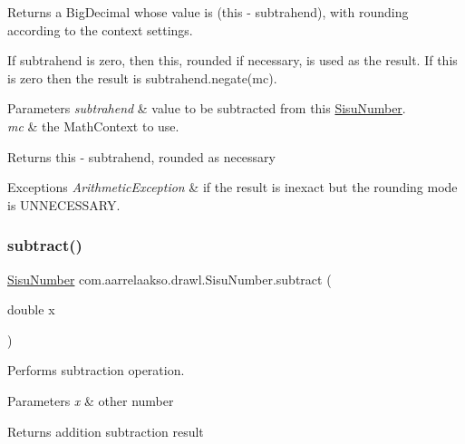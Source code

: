 Returns a Big\+Decimal whose value is (this -\/ subtrahend), with rounding according to the context settings. 

If subtrahend is zero, then this, rounded if necessary, is used as the result. If this is zero then the result is subtrahend.\+negate(mc).


\begin{DoxyParams}{Parameters}
{\em subtrahend} & value to be subtracted from this \hyperlink{classcom_1_1aarrelaakso_1_1drawl_1_1_sisu_number}{Sisu\+Number}. \\
\hline
{\em mc} & the Math\+Context to use. \\
\hline
\end{DoxyParams}
\begin{DoxyReturn}{Returns}
this -\/ subtrahend, rounded as necessary 
\end{DoxyReturn}

\begin{DoxyExceptions}{Exceptions}
{\em Arithmetic\+Exception} & if the result is inexact but the rounding mode is U\+N\+N\+E\+C\+E\+S\+S\+A\+RY. \\
\hline
\end{DoxyExceptions}
\mbox{\label{classcom_1_1aarrelaakso_1_1drawl_1_1_sisu_number_a16d6415b9c006f6d27a8ad5c60e77d03}} 
\subsubsection{\texorpdfstring{subtract()}{subtract()}\hspace{0.1cm}{\footnotesize\ttfamily [3/3]}}
{\footnotesize\ttfamily \hyperlink{classcom_1_1aarrelaakso_1_1drawl_1_1_sisu_number}{Sisu\+Number} com.\+aarrelaakso.\+drawl.\+Sisu\+Number.\+subtract (\begin{DoxyParamCaption}\item[{double}]{x }\end{DoxyParamCaption})\hspace{0.3cm}{\ttfamily [protected]}}



Performs subtraction operation. 


\begin{DoxyParams}{Parameters}
{\em x} & other number \\
\hline
\end{DoxyParams}
\begin{DoxyReturn}{Returns}
addition subtraction result 
\end{DoxyReturn}
\mbox{\label{classcom_1_1aarrelaakso_1_1drawl_1_1_sisu_number_a846e0834c619e63a8d85579484ab4276}} 
